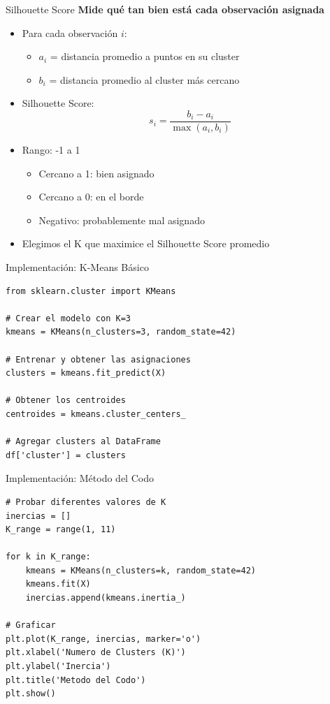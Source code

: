 \documentclass{beamer}
\begin{document}
\begin{frame}{Silhouette Score}
    \textbf{Mide qué tan bien está cada observación asignada}
    \begin{itemize}
        \item<1-> Para cada observación $i$:
        \begin{itemize}
            \item $a_i$ = distancia promedio a puntos en su cluster
            \item $b_i$ = distancia promedio al cluster más cercano
        \end{itemize}
        \item<2-> Silhouette Score:
        \[
        s_i = \frac{b_i - a_i}{\max(a_i, b_i)}
        \]
        \item<3-> Rango: -1 a 1
        \begin{itemize}
            \item Cercano a 1: bien asignado
            \item Cercano a 0: en el borde
            \item Negativo: probablemente mal asignado
        \end{itemize}
        \item<4-> Elegimos el K que maximice el Silhouette Score promedio
    \end{itemize}
\end{frame}

\begin{frame}[fragile]{Implementación: K-Means Básico}
    \begin{lstlisting}
from sklearn.cluster import KMeans

# Crear el modelo con K=3
kmeans = KMeans(n_clusters=3, random_state=42)

# Entrenar y obtener las asignaciones
clusters = kmeans.fit_predict(X)

# Obtener los centroides
centroides = kmeans.cluster_centers_

# Agregar clusters al DataFrame
df['cluster'] = clusters
    \end{lstlisting}
\end{frame}

\begin{frame}[fragile]{Implementación: Método del Codo}
    \begin{lstlisting}
# Probar diferentes valores de K
inercias = []
K_range = range(1, 11)

for k in K_range:
    kmeans = KMeans(n_clusters=k, random_state=42)
    kmeans.fit(X)
    inercias.append(kmeans.inertia_)

# Graficar
plt.plot(K_range, inercias, marker='o')
plt.xlabel('Numero de Clusters (K)')
plt.ylabel('Inercia')
plt.title('Metodo del Codo')
plt.show()
    \end{lstlisting}
\end{frame}
\end{document}
